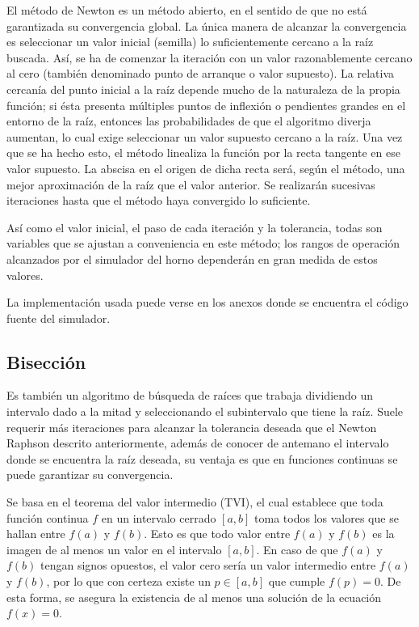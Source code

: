 \par El método de Newton es un método abierto, en el sentido de que no está garantizada su convergencia global. La única manera de alcanzar la convergencia es seleccionar un valor inicial (semilla) lo suficientemente cercano a la raíz buscada. Así, se ha de comenzar la iteración con un valor razonablemente cercano al cero (también denominado punto de arranque o valor supuesto). La relativa cercanía del punto inicial a la raíz depende mucho de la naturaleza de la propia función; si ésta presenta múltiples puntos de inflexión o pendientes grandes en el entorno de la raíz, entonces las probabilidades de que el algoritmo diverja aumentan, lo cual exige seleccionar un valor supuesto cercano a la raíz. Una vez que se ha hecho esto, el método linealiza la función por la recta tangente en ese valor supuesto. La abscisa en el origen de dicha recta será, según el método, una mejor aproximación de la raíz que el valor anterior. Se realizarán sucesivas iteraciones hasta que el método haya convergido lo suficiente. 

\par Así como el valor inicial, el paso de cada iteración y la tolerancia, todas son variables que se ajustan a conveniencia en este método; los rangos de operación alcanzados por el simulador del horno dependerán en gran medida de estos valores.

\par La implementación usada puede verse en los anexos donde se encuentra el código fuente del simulador.

\subsection{Bisección}

\par Es también un algoritmo de búsqueda de raíces que trabaja dividiendo un intervalo dado a la mitad y seleccionando el subintervalo que tiene la raíz. Suele requerir más iteraciones para alcanzar la tolerancia deseada que el Newton Raphson descrito anteriormente, además de conocer de antemano el intervalo donde se encuentra la raíz deseada, su ventaja es que en funciones continuas se puede garantizar su convergencia.
\par Se basa en el teorema del valor intermedio (TVI), el cual establece que toda función continua $f$ en un intervalo cerrado $[a,b]$ toma todos los valores que se hallan entre $f(a)$ y $f(b)$. 
Esto es que todo valor entre $f(a)$ y $f(b)$ es la imagen de al menos un valor en el intervalo $[a,b]$. En caso de que $f(a)$ y $f(b)$ tengan signos opuestos, el valor cero sería un valor intermedio entre $f(a)$ y $f(b)$, por lo que con certeza existe un  $p\in [a,b]$ que cumple  $f(p)=0$. 
De esta forma, se asegura la existencia de al menos una solución de la ecuación $f(x)=0$.